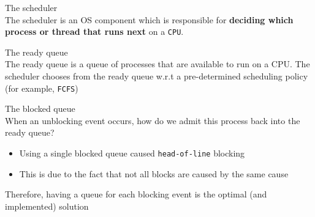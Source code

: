 \documentclass[journal, letterpaper]{IEEEtran}
\begin{document}
\begin{aside}{The scheduler} \\
    The scheduler is an OS component which is responsible for \textbf{deciding which process or thread that runs next} on a \verb|CPU|.
\end{aside}
\begin{theory}{The ready queue} \\
    The ready queue is a queue of processes that are available to run on a CPU. The scheduler chooses from the ready queue w.r.t a pre-determined scheduling policy (for example, \verb|FCFS|)
\end{theory}
\begin{theory}{The blocked queue} \\
    When an unblocking event occurs, how do we admit this process back into the ready queue?
    \begin{itemize}
        \item Using a single blocked queue caused \verb|head-of-line| blocking
        \item This is due to the fact that not all blocks are caused by the same cause
    \end{itemize}
    Therefore, having a queue for each blocking event is the optimal (and implemented) solution
\end{theory}
\end{document}
